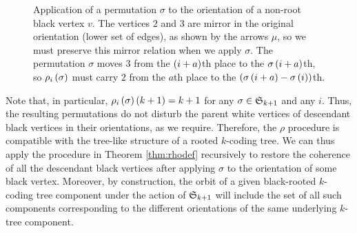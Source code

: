 \documentclass[sectionflow,singlespace,twoside,boldmathhdr,draft]{brandiss} %
\numberwithin{section}{chapter}
\numberwithin{figure}{chapter}
\begin{document}
\begin{figure}[htbp]
  \centering
  \caption[The permutation-modifying map $\rho$]{Application of a permutation $\sigma$ to the orientation of a non-root black vertex $v$.
    The vertices $2$ and $3$ are mirror in the original orientation (lower set of edges), as shown by the arrows $\mu$, so we must preserve this mirror relation when we apply $\sigma$.
    The permutation $\sigma$ moves $3$ from the $\left( {i+a} \right)$th place to the $\sigma \left( {i+a} \right)$th, so $\rho_{i} \left( {\sigma} \right)$ must carry $2$ from the $a$th place to the $\left( {\sigma \left( {i+a} \right) - \sigma \left( {i} \right)} \right)$th.}
  \label{fig:rhoapp}
\end{figure}

Note that, in particular, $\rho_{i} \left( {\sigma} \right) \left( {k+1} \right) = k+1$ for any $\sigma \in  \mathfrak{S}_{k+1} $ and any $i$.
Thus, the resulting permutations do not disturb the parent white vertices of descendant black vertices in their orientations, as we require.
Therefore, the $\rho$ procedure is compatible with the tree-like structure of a rooted $k$-coding tree.
We can thus apply the procedure in Theorem \ref{thm:rhodef} recursively to restore the coherence of all the descendant black vertices after applying $\sigma$ to the orientation of some black vertex.
Moreover, by construction, the orbit of a given black-rooted $k$-coding tree component under the action of $ \mathfrak{S}_{k+1} $ will include the set of all such components corresponding to the different orientations of the same underlying $k$-tree component.
\end{document}
